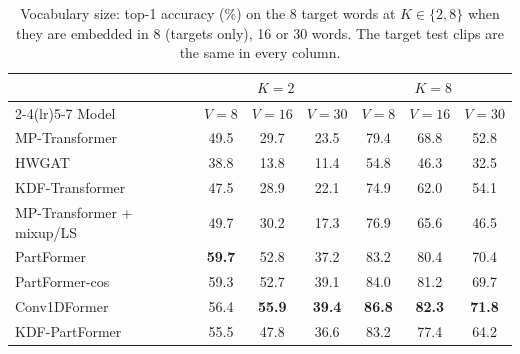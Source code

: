 \begin{table}[t]
\centering
\small
\caption{Vocabulary size: top-1 accuracy (\%) on the 8 target words at $K\in\{2,8\}$ when they are embedded in 8 (targets only), 16 or 30 words. The target test clips are the same in every column.}
\label{tab:vocab}
\begin{tabular}{lcccccc}
\toprule
 & \multicolumn{3}{c}{$K=2$} & \multicolumn{3}{c}{$K=8$} \\
\cmidrule(lr){2-4}\cmidrule(lr){5-7}
Model & $V{=}8$ & $V{=}16$ & $V{=}30$ & $V{=}8$ & $V{=}16$ & $V{=}30$ \\
\midrule
MP-Transformer & 49.5 & 29.7 & 23.5 & 79.4 & 68.8 & 52.8 \\
HWGAT & 38.8 & 13.8 & 11.4 & 54.8 & 46.3 & 32.5 \\
KDF-Transformer & 47.5 & 28.9 & 22.1 & 74.9 & 62.0 & 54.1 \\
MP-Transformer + mixup/LS & 49.7 & 30.2 & 17.3 & 76.9 & 65.6 & 46.5 \\
PartFormer & \textbf{59.7} & 52.8 & 37.2 & 83.2 & 80.4 & 70.4 \\
PartFormer-cos & 59.3 & 52.7 & 39.1 & 84.0 & 81.2 & 69.7 \\
Conv1DFormer & 56.4 & \textbf{55.9} & \textbf{39.4} & \textbf{86.8} & \textbf{82.3} & \textbf{71.8} \\
KDF-PartFormer & 55.5 & 47.8 & 36.6 & 83.2 & 77.4 & 64.2 \\
\bottomrule
\end{tabular}
\end{table}
